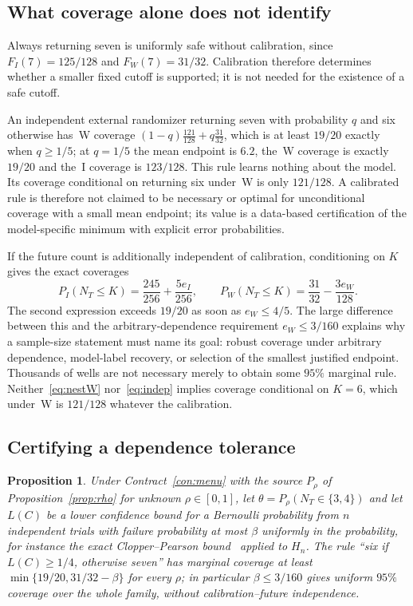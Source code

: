 \documentclass[11pt,a4paper]{article}
\theoremstyle{plain}
\newtheorem{proposition}[theorem]{Proposition}
\theoremstyle{definition}
\theoremstyle{remark}
\begin{document}
\subsection{What coverage alone does not identify}\label{sec:baselines}
Always returning seven is uniformly safe without calibration, since $F_I(7)=125/128$ and $F_W(7)=31/32$. Calibration therefore determines whether a smaller fixed cutoff is supported; it is not needed for the existence of a safe cutoff.

An independent external randomizer returning seven with probability $q$ and six otherwise has~W coverage $(1-q)\tfrac{121}{128}+q\tfrac{31}{32}$, which is at least $19/20$ exactly when $q\ge1/5$; at $q=1/5$ the mean endpoint is $6.2$, the~W coverage is exactly $19/20$ and the~I coverage is $123/128$. This rule learns nothing about the model. Its coverage conditional on returning six under~W is only $121/128$. A calibrated rule is therefore not claimed to be necessary or optimal for unconditional coverage with a small mean endpoint; its value is a data-based certification of the model-specific minimum with explicit error probabilities.

If the future count is additionally independent of calibration, conditioning on $K$ gives the exact coverages
\begin{equation}\label{eq:indep}
P_I(N_T\le K)=\frac{245}{256}+\frac{5e_I}{256},\qquad P_W(N_T\le K)=\frac{31}{32}-\frac{3e_W}{128}.
\end{equation}
The second expression exceeds $19/20$ as soon as $e_W\le4/5$. The large difference between this and the arbitrary-dependence requirement $e_W\le3/160$ explains why a sample-size statement must name its goal: robust coverage under arbitrary dependence, model-label recovery, or selection of the smallest justified endpoint. Thousands of wells are not necessary merely to obtain some $95\%$ marginal rule. Neither~\eqref{eq:nestW} nor~\eqref{eq:indep} implies coverage conditional on $K=6$, which under~W is $121/128$ whatever the calibration.

\subsection{Certifying a dependence tolerance}
\begin{proposition}\label{prop:rhorule}
Under Contract~\ref{con:menu} with the source $P_\rho$ of Proposition~\ref{prop:rho} for unknown $\rho\in[0,1]$, let $\theta=P_\rho(N_T\in\{3,4\})$ and let $L(C)$ be a lower confidence bound for a Bernoulli probability from $n$ independent trials with failure probability at most $\beta$ uniformly in the probability, for instance the exact Clopper--Pearson bound~\citep{clopper1934} applied to $H_n$. The rule ``six if $L(C)\ge1/4$, otherwise seven'' has marginal coverage at least $\min\{19/20,31/32-\beta\}$ for every $\rho$; in particular $\beta\le3/160$ gives uniform $95\%$ coverage over the whole family, without calibration--future independence.
\end{proposition}
\end{document}
